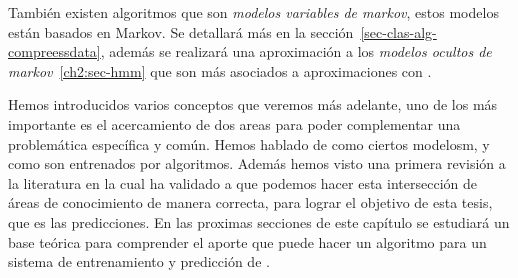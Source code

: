 También existen algoritmos que son \emph{modelos variables de markov}, estos modelos están basados en Markov. Se detallará más en la sección~\ref{sec-clas-alg-compreessdata}, además se realizará una aproximación a los \emph{modelos ocultos de markov}~\ref{ch2:sec-hmm} que son más asociados a aproximaciones con \machinelearning.




\uncm
Hemos introducidos varios conceptos que veremos más adelante, uno de los más importante es el acercamiento de dos areas para poder complementar una problemática específica y común. Hemos hablado de como ciertos modelosm, y como son entrenados por algoritmos. Además hemos visto una primera revisión a la literatura en la cual ha validado a que podemos hacer esta intersección de áreas de conocimiento de manera correcta, para lograr el objetivo de esta tesis, que es las predicciones. En las proximas secciones de este capítulo se estudiará un base teórica para comprender el aporte que puede hacer un algoritmo \losslessdatacompression para un sistema de entrenamiento y predicción de \machinelearning.








